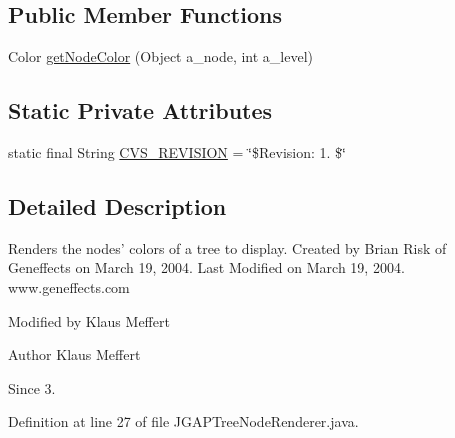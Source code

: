 \subsection*{Public Member Functions}
\begin{DoxyCompactItemize}
\item 
Color \hyperlink{classorg_1_1jgap_1_1gp_1_1impl_1_1_j_g_a_p_tree_node_renderer_a81b441045465cbdb92a6c1c4f429be77}{get\-Node\-Color} (Object a\-\_\-node, int a\-\_\-level)
\end{DoxyCompactItemize}
\subsection*{Static Private Attributes}
\begin{DoxyCompactItemize}
\item 
static final String \hyperlink{classorg_1_1jgap_1_1gp_1_1impl_1_1_j_g_a_p_tree_node_renderer_a8575c4e8148aabdc8c2979b7eb7b9cd0}{C\-V\-S\-\_\-\-R\-E\-V\-I\-S\-I\-O\-N} = \char`\"{}\$Revision\-: 1. \$\char`\"{}
\end{DoxyCompactItemize}


\subsection{Detailed Description}
Renders the nodes' colors of a tree to display. Created by Brian Risk of Geneffects on March 19, 2004. Last Modified on March 19, 2004. www.\-geneffects.\-com

Modified by Klaus Meffert

\begin{DoxyAuthor}{Author}
Klaus Meffert 
\end{DoxyAuthor}
\begin{DoxySince}{Since}
3. 
\end{DoxySince}


Definition at line 27 of file J\-G\-A\-P\-Tree\-Node\-Renderer.\-java.



